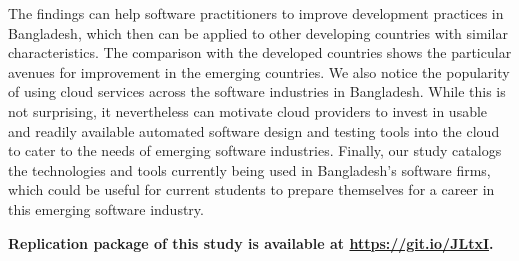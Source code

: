 

The findings can help software practitioners to
improve development practices in Bangladesh, which then can be applied to other developing countries with similar 
characteristics. The comparison with the developed countries shows the particular avenues for improvement in the emerging countries. 
We also notice the popularity of using cloud services across the software industries in Bangladesh. 
While this is not surprising, it nevertheless can motivate cloud providers to invest in usable and 
readily available automated software design and testing tools into the cloud to cater to the needs of 
emerging software industries. Finally, our study catalogs the
technologies and tools currently being used in Bangladesh's software firms, which could be 
useful for current students to prepare themselves for a career in this emerging software industry. 

\nd\bf{Replication package} of this study is available at \url{https://git.io/JLtxI}.

% 


